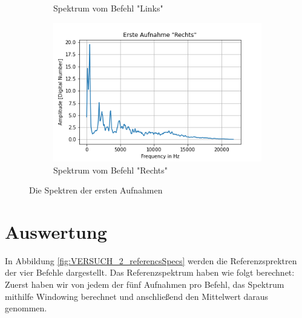 \documentclass[12pt, oneside, a4paper, \docLanguage]{report}
\begin{document}
\begin{figure}[H]
\begin{subfigure}{.5\textwidth}
  		\caption{Spektrum vom Befehl "Links"}
  		\label{fig:VERSUCH_2_sub3}
	\end{subfigure}%
	\begin{subfigure}{.5\textwidth}
  		\centering
 		 \includegraphics[width=.95\linewidth]{media/ersteAufnahmeRechts.png}
  		\caption{Spektrum vom Befehl "Rechts"}
  		\label{fig:VERSUCH_2_sub4}
	\end{subfigure}
	\caption{Die Spektren der ersten Aufnahmen}
	\label{fig:VERSUCH_2_firstSpectrums}
\end{figure}
\newpage
\section{Auswertung}
\label{chap:VERSUCH_2_AUSWERTUNG}
In Abbildung \ref{fig:VERSUCH_2_referencsSpecs} werden die Referenzsprektren der vier Befehle dargestellt. Das Referenzspektrum haben wie folgt berechnet: Zuerst haben wir von jedem der fünf Aufnahmen pro Befehl, das Spektrum mithilfe Windowing berechnet und anschließend den Mittelwert daraus genommen.
\end{document}
